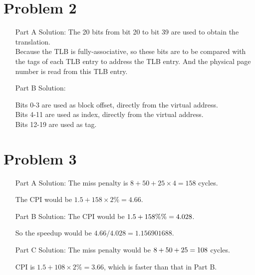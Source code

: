 \documentclass[11pt,leqno]{article}
\begin{document}
\section*{Problem 2}
\begin{enumerate}
\item[Part A] Solution:
The 20 bits from bit 20 to bit 39 are used to obtain the translation.\\
Because the TLB is fully-associative, so these bits are to be compared with the tags of each TLB entry to address the TLB entry. And the physical page number is read from this TLB entry.

\item[Part B] Solution:

Bits 0-3 are used as block offset, directly from the virtual address.\\
Bits 4-11 are used as index, directly from the virtual address.\\
Bits 12-19 are used as tag.

\end{enumerate}

\section*{Problem 3}
\begin{enumerate}
\item[Part A] Solution:
The miss penalty is $8 + 50 + 25 \times 4 = 158$ cycles.

The CPI would be $1.5 + 158 \times 2\%= 4.66$.

\item[Part B] Solution:
The CPI would be $1.5 + 158 \time 80\% \time 2\% = 4.028$.

So the speedup would be $4.66/4.028 = 1.156901688$. 

\item[Part C] Solution:
The miss penalty would be $8 + 50 + 25 \time 2 = 108$ cycles.

CPI is $1.5 + 108 \times 2\% = 3.66$, which is faster than that in Part B.

\end{enumerate}
\end{document}
